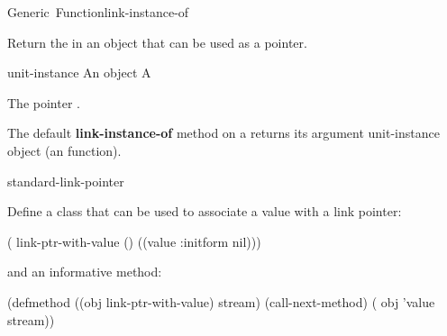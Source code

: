 \documentclass[10pt,twoside,english,pdftex]{article}
\begin{document}
\begin{functiondoc}{Generic~Function}{link-instance-of}{
    }

\fnsyntax

\fnpurpose Return the  in an object that can be used 
as a  pointer.

\fnsetf
{}

\fnmethods
{}%
 {\code{(} 
  \returns{} }

\fnpackage {}

\fnmodule {}

\fnargs
\begin{args}{unit-instance}
\arg[object] An object
 A 
\end{args}

\fnreturns The  pointer .

\fndescription
%
The default \textbf{link-instance-of} method on a  
returns its argument unit-instance object (an  function).

\begin{alsos}{standard-link-pointer}
\also[linkf]
\also[unlinkf]
\end{alsos}

\fnexample
%
%
%
%
%
%
Define a  class that can be used to associate a value
with a link pointer:
%
\W\supp
\begin{example}
  ( link-ptr-with-value ()
     ((value :initform nil)))
\end{example}
%
%
%
and an informative  method:
%
\W\supp\notpretop
\begin{example}
  (defmethod  ((obj link-ptr-with-value) stream)
    (call-next-method)
    ( obj 'value stream))
\end{example}

\end{functiondoc}
\end{document}
